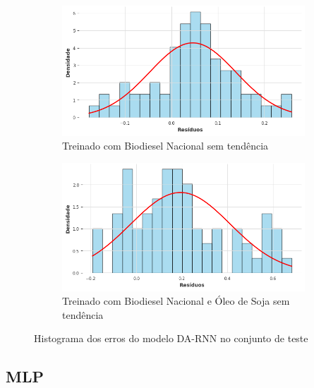 \begin{figure}[htbp]
	\begin{subfigure}[b]{0.40\textwidth}
		\centering
		\includegraphics[width=\textwidth]{figuras/darnn_brasil_detrend_residuals_histogram.png} %
		\caption{Treinado com Biodiesel Nacional sem tendência}
		\label{fig:darnn_brasil_detrend_residuals_histogram}
	\end{subfigure}
	\hfill
	\begin{subfigure}[b]{0.40\textwidth}
		\centering
		\includegraphics[width=\textwidth]{figuras/darnn_brasil_oil_detrend_residuals_histogram.png} %
		\caption{Treinado com Biodiesel Nacional e Óleo de Soja sem tendência}
		\label{fig:darnn_brasil_oil_detrend_residuals_histogram}
	\end{subfigure}

	\caption{Histograma dos erros do modelo \acs{DA-RNN} no conjunto de teste}
	\label{fig:darnn_residuals_histogram}
\end{figure}

\subsection{\acs{MLP}}
